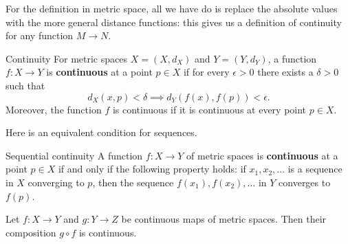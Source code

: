 For the definition in metric space, all we have do is replace the absolute values with the more general distance functions: this gives us a definition of continuity for any function $M \to N$.

\begin{defn}{Continuity}{}
For metric spaces $X = (X, d_X)$ and $Y = (Y, d_Y)$, a function $f:X \to Y$ is \textbf{continuous} at a point $p \in X$ if for every $\epsilon > 0$ there exists a $\delta > 0$ such that
\[ d_X(x,p) < \delta \implies d_Y(f(x), f(p)) < \epsilon. \]
Moreover, the function $f$ is continuous if it is continuous at every point $p \in X$.
\end{defn}

Here is an equivalent condition for sequences.

\begin{thrm}{Sequential continuity}{}
A function $f:X \to Y$ of metric spaces is \textbf{continuous} at a point $p \in X$ if and only if the following property holds: if $x_1, x_2, \dots$ is a sequence in $X$ converging to $p$, then the sequence $f(x_1), f(x_2), \dots$ in $Y$ converges to $f(p)$.
\end{thrm}

\begin{proposition}
Let $f: X \to Y$ and $g: Y \to Z$ be continuous maps of metric spaces. Then their composition $g \circ f$ is continuous.
\end{proposition}
\pagebreak

